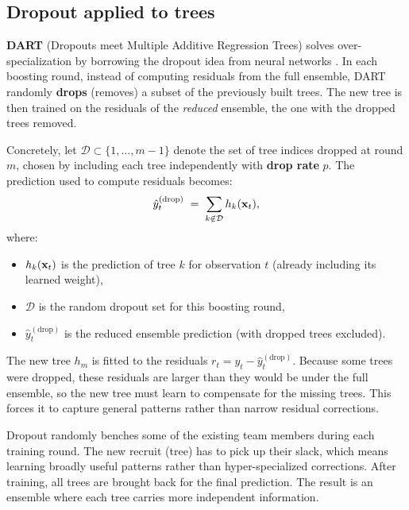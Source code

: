 \subsection*{Dropout applied to trees}

\textbf{DART} (Dropouts meet Multiple Additive Regression Trees) solves
over-specialization by borrowing the dropout idea from neural networks
\citep{VinayakGilad2015}.  In each boosting round, instead of computing
residuals from the full ensemble, DART randomly \textbf{drops} (removes) a
subset of the previously built trees.  The new tree is then trained on the
residuals of the \emph{reduced} ensemble, the one with the dropped trees
removed.

Concretely, let $\mathcal{D} \subset \{1, \ldots, m-1\}$ denote the set of
tree indices dropped at round $m$, chosen by including each tree
independently with \textbf{drop rate} $p$.  The prediction used to compute
residuals becomes:
\begin{equation}\label{eq:trees:dart_pred}
  \hat{y}^{(\text{drop})}_t
  \;=\; \sum_{k \notin \mathcal{D}} h_k(\mathbf{x}_t),
\end{equation}
where:
\begin{itemize}[leftmargin=1.8em]
  \item $h_k(\mathbf{x}_t)$ is the prediction of tree $k$ for observation $t$
        (already including its learned weight),
  \item $\mathcal{D}$ is the random dropout set for this boosting round,
  \item $\hat{y}^{(\text{drop})}_t$ is the reduced ensemble prediction
        (with dropped trees excluded).
\end{itemize}

The new tree $h_m$ is fitted to the residuals
$r_t = y_t - \hat{y}^{(\text{drop})}_t$.  Because some trees were dropped,
these residuals are larger than they would be under the full ensemble, so the
new tree must learn to compensate for the missing trees.  This forces it to
capture general patterns rather than narrow residual corrections.

\begin{intuition}
Dropout randomly benches some of the existing team members during each
training round.  The new recruit (tree) has to pick up their slack, which
means learning broadly useful patterns rather than hyper-specialized
corrections.  After training, all trees are brought back for the final
prediction.  The result is an ensemble where each tree carries more
independent information.
\end{intuition}

